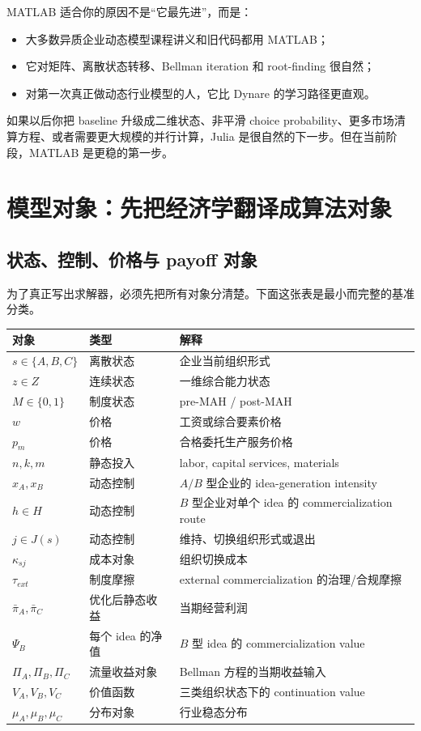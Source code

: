 \documentclass[12pt]{ctexart}
\begin{document}
MATLAB 适合你的原因不是“它最先进”，而是：
\begin{itemize}
    \item 大多数异质企业动态模型课程讲义和旧代码都用 MATLAB；
    \item 它对矩阵、离散状态转移、Bellman iteration 和 root-finding 很自然；
    \item 对第一次真正做动态行业模型的人，它比 Dynare 的学习路径更直观。
\end{itemize}

如果以后你把 baseline 升级成二维状态、非平滑 choice probability、更多市场清算方程、或者需要更大规模的并行计算，Julia 是很自然的下一步。但在当前阶段，MATLAB 是更稳的第一步。

\section{模型对象：先把经济学翻译成算法对象}

\subsection{状态、控制、价格与 payoff 对象}

为了真正写出求解器，必须先把所有对象分清楚。下面这张表是最小而完整的基准分类。

\begin{longtable}{p{}p{}p{}}
\toprule
对象 & 类型 & 解释 \\
\midrule
\endhead
$s\in\{A,B,C\}$ & 离散状态 & 企业当前组织形式 \\
$z\in Z$ & 连续状态 & 一维综合能力状态 \\
$M\in\{0,1\}$ & 制度状态 & pre-MAH / post-MAH \\
$w$ & 价格 & 工资或综合要素价格 \\
$p_m$ & 价格 & 合格委托生产服务价格 \\
$n,k,m$ & 静态投入 & labor, capital services, materials \\
$x_A,x_B$ & 动态控制 & $A/B$ 型企业的 idea-generation intensity \\
$h\in H$ & 动态控制 & $B$ 型企业对单个 idea 的 commercialization route \\
$j\in J(s)$ & 动态控制 & 维持、切换组织形式或退出 \\
$\kappa_{sj}$ & 成本对象 & 组织切换成本 \\
$\tau_{ext}$ & 制度摩擦 & external commercialization 的治理/合规摩擦 \\
$\bar\pi_A,\bar\pi_C$ & 优化后静态收益 & 当期经营利润 \\
$\Psi_B$ & 每个 idea 的净值 & $B$ 型 idea 的 commercialization value \\
$\Pi_A,\Pi_B,\Pi_C$ & 流量收益对象 & Bellman 方程的当期收益输入 \\
$V_A,V_B,V_C$ & 价值函数 & 三类组织状态下的 continuation value \\
$\mu_A,\mu_B,\mu_C$ & 分布对象 & 行业稳态分布 \\
\bottomrule
\end{longtable}
\end{document}

